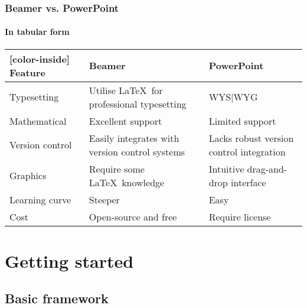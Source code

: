 \documentclass[aspectratio=1610]{beamer}
\begin{document}
\begin{frame}
    \frametitle{Beamer vs. PowerPoint}
    \framesubtitle{In tabular form}
    \begin{table}
        \begin{NiceTabular}{l p{.35\textwidth} p{.35\textwidth}}[color-inside]
            \toprule
            \textbf{Feature} & \textbf{Beamer}                                & \textbf{PowerPoint}                      \\
            \midrule
            Typesetting      & Utilise \LaTeX\ for professional typesetting   & WYS$\vert$WYG                            \\
            Mathematical     & Excellent support                              & Limited support                          \\
            Version control  & Easily integrates with version control systems & Lacks robust version control integration \\
            Graphics         & Require some \LaTeX\ knowledge                 & Intuitive drag-and-drop interface        \\
            Learning curve   & Steeper                                        & Easy                                     \\
            Cost             & Open-source and free                           & Require license                          \\
            \bottomrule
        \end{NiceTabular}
    \end{table}
\end{frame}

\section{Getting started}

\subsection{Basic framework}

\end{document}

